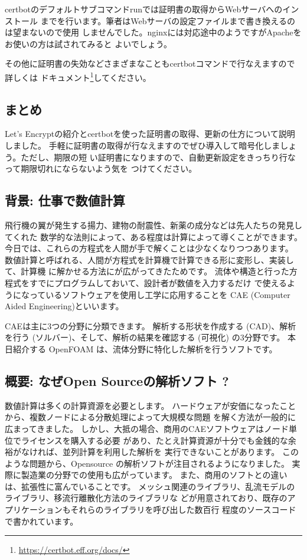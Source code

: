 \documentclass[mingoth,a4paper]{jsarticle}
\begin{document}
certbotのデフォルトサブコマンドrunでは証明書の取得からWebサーバへのインストール
までを行います。筆者はWebサーバの設定ファイルまで書き換えるのは望まないので使用
しませんでした。nginxには対応途中のようですがApacheをお使いの方は試されてみると
よいでしょう。

その他に証明書の失効などさまざまなこともcertbotコマンドで行なえますので詳しくは
ドキュメント\footnote{\url{https://certbot.eff.org/docs/}}してください。


\subsection{まとめ}

Let's Encryptの紹介とcertbotを使った証明書の取得、更新の仕方について説明しました。
手軽に証明書の取得が行なえますのでぜひ導入して暗号化しましょう。ただし、期限の短
い証明書になりますので、自動更新設定をきっちり行なって期限切れにならないよう気を
つけてください。


\subsection{背景: 仕事で数値計算}
飛行機の翼が発生する揚力、建物の耐震性、新薬の成分などは先人たちの発見してくれた
数学的な法則によって、ある程度は計算によって導くことができます。
今日では、これらの方程式を人間が手で解くことは少なくなりつつあります。
数値計算と呼ばれる、人間が方程式を計算機で計算できる形に変形し、実装して、計算機
に解かせる方法にが広がってきたためです。
流体や構造と行った方程式をすでにプログラムしておいて、設計者が数値を入力するだけ
で使えるようになっているソフトウェアを使用し工学に応用することを CAE (Computer
Aided Engineering)といいます。

CAEは主に3つの分野に分類できます。
解析する形状を作成する (CAD)、解析を行う (ソルバー)、そして、解析の結果を確認する
(可視化) の3分野です。
本日紹介する OpenFOAM は、流体分野に特化した解析を行うソフトです。

\subsection{概要: なぜOpen Sourceの解析ソフト ? }
数値計算は多くの計算資源を必要とします。
ハードウェアが安価になったことから、複数ノードによる分散処理によって大規模な問題
を解く方法が一般的に広まってきました。
しかし、大抵の場合、商用のCAEソフトウェアはノード単位でライセンスを購入する必要
があり、たとえ計算資源が十分でも金銭的な余裕がなければ、並列計算を利用した解析を
実行できないことがあります。
このような問題から、Opensource の解析ソフトが注目されるようになりました。
実際に製造業の分野での使用も広がっています。
また、商用のソフトとの違いは、拡張性に富んでいることです。
メッシュ関連のライブラリ、乱流モデルのライブラリ、移流行離散化方法のライブラリな
どが用意されており、既存のアプリケーションもそれらのライブラリを呼び出した数百行
程度のソースコードで書かれています。
\end{document}
